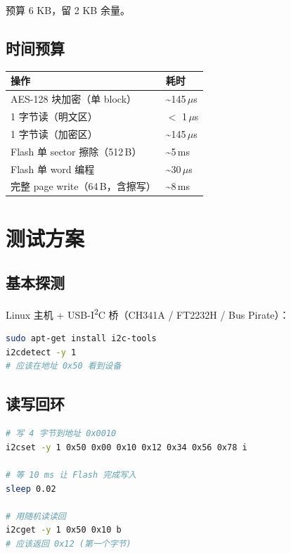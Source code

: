 \documentclass[UTF8,a4paper,11pt]{ctexart}
\begin{document}
预算 6 KB，留 2 KB 余量。

\subsection{时间预算}

\begin{center}
\begin{tabular}{ll}
\toprule
\textbf{操作} & \textbf{耗时} \\
\midrule
AES-128 块加密（单 block）            & \textasciitilde 145\,$\mu$s \\
1 字节读（明文区）                    & $<$ 1\,$\mu$s \\
1 字节读（加密区）                    & \textasciitilde 145\,$\mu$s \\
Flash 单 sector 擦除（512\,B）        & \textasciitilde 5\,ms \\
Flash 单 word 编程                    & \textasciitilde 30\,$\mu$s \\
完整 page write（64\,B，含擦写）      & \textasciitilde 8\,ms \\
\bottomrule
\end{tabular}
\end{center}

\section{测试方案}

\subsection{基本探测}

Linux 主机 + USB-I\textsuperscript{2}C 桥（CH341A / FT2232H / Bus Pirate）：

\begin{lstlisting}[language=bash]
sudo apt-get install i2c-tools
i2cdetect -y 1
# 应该在地址 0x50 看到设备
\end{lstlisting}

\subsection{读写回环}

\begin{lstlisting}[language=bash]
# 写 4 字节到地址 0x0010
i2cset -y 1 0x50 0x00 0x10 0x12 0x34 0x56 0x78 i

# 等 10 ms 让 Flash 完成写入
sleep 0.02

# 用随机读读回
i2cget -y 1 0x50 0x10 b
# 应该返回 0x12 (第一个字节)
\end{lstlisting}
\end{document}
